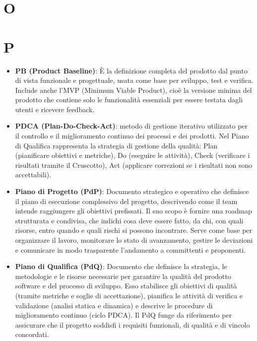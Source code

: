 \documentclass[11pt,a4paper]{article}
\begin{document}
\newpage

\section*{O}

\newpage

\section*{P}
\begin{itemize}
\item \textbf{PB (Product Baseline)}: È la definizione completa del prodotto dal punto di vista funzionale e progettuale, usata come base per sviluppo, test e verifica. Include anche l’MVP (Minimum Viable Product), cioè la versione minima del prodotto che contiene solo le funzionalità essenziali per essere testata dagli utenti e ricevere feedback.

\item \textbf{PDCA (Plan-Do-Check-Act)}: metodo di gestione iterativo utilizzato per il controllo e il miglioramento continuo dei processi e dei prodotti. Nel Piano di Qualifica rappresenta la strategia di gestione della qualità: Plan (pianificare obiettivi e metriche), Do (eseguire le attività), Check (verificare i risultati tramite il Cruscotto), Act (applicare correzioni se i risultati non sono accettabili).

\item \textbf{Piano di Progetto (PdP)}: Documento strategico e operativo che definisce il piano di esecuzione complessivo del progetto, descrivendo come il team intende raggiungere gli obiettivi prefissati. Il suo scopo è fornire una roadmap strutturata e condivisa, che indichi cosa deve essere fatto, da chi, con quali risorse, entro quando e quali rischi si possono incontrare. Serve come base per organizzare il lavoro, monitorare lo stato di avanzamento, gestire le deviazioni e comunicare in modo trasparente l’andamento a committenti e proponenti.

\item \textbf{Piano di Qualifica (PdQ)}: Documento che definisce la strategia, le metodologie e le risorse necessarie per garantire la qualità del prodotto software e del processo di sviluppo. Esso stabilisce gli obiettivi di qualità (tramite metriche e soglie di accettazione), pianifica le attività di verifica e validazione (analisi statica e dinamica) e descrive le procedure di miglioramento continuo (ciclo PDCA). Il PdQ funge da riferimento per assicurare che il progetto soddisfi i requisiti funzionali, di qualità e di vincolo concordati.


\end{itemize}
\end{document}
